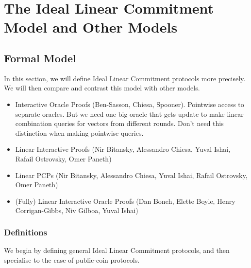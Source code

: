 \chapter{The Ideal Linear Commitment Model and Other Models}
\label{chapterlabel:Models}

\section{Formal Model}
\label{formalILCmodel}

In this section, we will define Ideal Linear Commitment protocols more precisely. We will then compare and contrast this model with other models.
\begin{itemize}
\item Interactive Oracle Proofs (Ben-Sasson, Chiesa, Spooner). Pointwise access to separate oracles. But we need one big oracle that gets update to make linear combination queries for vectors from different rounds. Don't need this distinction when making pointwise queries.
\item Linear Interactive Proofs (Nir Bitansky, Alessandro Chiesa, Yuval Ishai, Rafail Ostrovsky, Omer Paneth)
\item Linear PCPs (Nir Bitansky, Alessandro Chiesa, Yuval Ishai, Rafail Ostrovsky, Omer Paneth)
\item (Fully) Linear Interactive Oracle Proofs (Dan Boneh, Elette Boyle, Henry Corrigan-Gibbs, Niv Gilboa, Yuval Ishai)
\end{itemize}

\subsection{Definitions}

We begin by defining general Ideal Linear Commitment protocols, and then specialise to the case of public-coin protocols.

